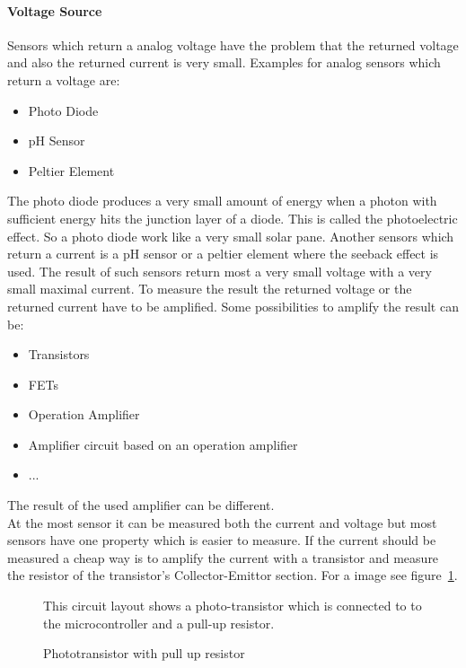 \paragraph{Voltage Source}
Sensors which return a analog voltage have the problem that the returned voltage and also the returned current is very small.
Examples for analog sensors which return a voltage are:
\begin{itemize}
\item Photo Diode
\item pH Sensor
\item Peltier Element
\end{itemize}
The photo diode produces a very small amount of energy when a photon with sufficient energy hits the junction layer of a diode.
This is called the photoelectric effect.
So a photo diode work like a very small solar pane.
Another sensors which return a current is a pH sensor or a peltier element where the seeback effect is used.
The result of such sensors return most a very small voltage with a very small maximal current.
To measure the result the returned voltage or the returned current have to be amplified.
Some possibilities to amplify the result can be:
\begin{itemize}
\item Transistors
\item FETs
\item Operation Amplifier
\item Amplifier circuit based on an operation amplifier
\item ...
\end{itemize}
The result of the used amplifier can be different.\\
At the most sensor it can be measured both the current and voltage but most sensors have one property which is easier to measure.
If the current should be measured a cheap way is to amplify the current with a transistor and measure the resistor of the transistor's Collector-Emittor section.
For a image see figure~\ref{fig:phototransistorWithPullUp}.

\begin{figure}
\caption{Phototransistor with pull up resistor}
\medskip
\small
This circuit layout shows a photo-transistor which is connected to to the microcontroller and a pull-up resistor.
\label{fig:phototransistorWithPullUp}
\end{figure}


